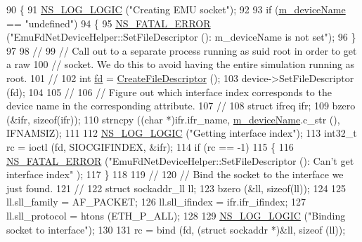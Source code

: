 \begin{DoxyCode}
90 \{
91   \hyperlink{group__logging_ga88acd260151caf2db9c0fc84997f45ce}{NS\_LOG\_LOGIC} (\textcolor{stringliteral}{"Creating EMU socket"});
92 
93   \textcolor{keywordflow}{if} (\hyperlink{classns3_1_1EmuFdNetDeviceHelper_a5c259590827f139ae1189a99addeca6a}{m\_deviceName} == \textcolor{stringliteral}{"undefined"})
94     \{
95       \hyperlink{group__fatal_ga5131d5e3f75d7d4cbfd706ac456fdc85}{NS\_FATAL\_ERROR} (\textcolor{stringliteral}{"EmuFdNetDeviceHelper::SetFileDescriptor (): m\_deviceName is not set"});
96     \}
97 
98   \textcolor{comment}{//}
99   \textcolor{comment}{// Call out to a separate process running as suid root in order to get a raw}
100   \textcolor{comment}{// socket.  We do this to avoid having the entire simulation running as root.}
101   \textcolor{comment}{//}
102   \textcolor{keywordtype}{int} \hyperlink{lte_2model_2fading-traces_2fading__trace__generator_8m_a44f21d5190b5a6df8089f54799628d7e}{fd} = \hyperlink{classns3_1_1EmuFdNetDeviceHelper_a64392b0acfeddf0121b251bc7e6e8906}{CreateFileDescriptor} ();
103   device->SetFileDescriptor (fd);
104 
105   \textcolor{comment}{//}
106   \textcolor{comment}{// Figure out which interface index corresponds to the device name in the corresponding attribute.}
107   \textcolor{comment}{//}
108   \textcolor{keyword}{struct }ifreq ifr;
109   bzero (&ifr, \textcolor{keyword}{sizeof}(ifr));
110   strncpy ((\textcolor{keywordtype}{char} *)ifr.ifr\_name, \hyperlink{classns3_1_1EmuFdNetDeviceHelper_a5c259590827f139ae1189a99addeca6a}{m\_deviceName}.c\_str (), IFNAMSIZ);
111 
112   \hyperlink{group__logging_ga88acd260151caf2db9c0fc84997f45ce}{NS\_LOG\_LOGIC} (\textcolor{stringliteral}{"Getting interface index"});
113   int32\_t rc = ioctl (fd, SIOCGIFINDEX, &ifr);
114   \textcolor{keywordflow}{if} (rc == -1)
115     \{
116       \hyperlink{group__fatal_ga5131d5e3f75d7d4cbfd706ac456fdc85}{NS\_FATAL\_ERROR} (\textcolor{stringliteral}{"EmuFdNetDeviceHelper::SetFileDescriptor (): Can't get interface index"}
      );
117     \}
118 
119   \textcolor{comment}{//}
120   \textcolor{comment}{// Bind the socket to the interface we just found.}
121   \textcolor{comment}{//}
122   \textcolor{keyword}{struct }sockaddr\_ll ll;
123   bzero (&ll, \textcolor{keyword}{sizeof}(ll));
124 
125   ll.sll\_family = AF\_PACKET;
126   ll.sll\_ifindex = ifr.ifr\_ifindex;
127   ll.sll\_protocol = htons (ETH\_P\_ALL);
128 
129   \hyperlink{group__logging_ga88acd260151caf2db9c0fc84997f45ce}{NS\_LOG\_LOGIC} (\textcolor{stringliteral}{"Binding socket to interface"});
130 
131   rc = bind (fd, (\textcolor{keyword}{struct} sockaddr *)&ll, \textcolor{keyword}{sizeof} (ll));

\end{DoxyCode}

